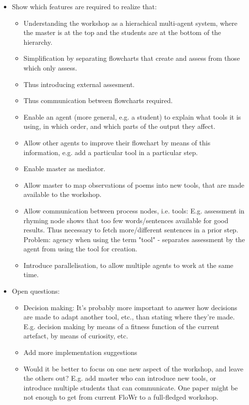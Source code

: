 \begin{itemize}
\begin{itemize}
	\end{itemize}
\item Show which features are required to realize that:
	\begin{itemize}
	\item Understanding the workshop as a hierachical multi-agent system, where the master is at the top and the students are at the bottom of the hierarchy. 
	\item Simplification by separating flowcharts that create and assess from those which only assess. 
	\item Thus introducing external assesment.
	\item Thus communication between flowcharts required.
	\item Enable an agent (more general, e.g. a student) to explain what tools it is using, in which order, and which parts of the output they affect.
	\item Allow other agents to improve their flowchart by means of this information, e.g. add a particular tool in a particular step.
	\item Enable master as mediator.
	\item Allow master to map observations of poems into new tools, that are made available to the workshop.
	\item Allow communication between process nodes, i.e. tools: E.g. assessment in rhyming node shows that too few words/sentences available for good results. Thus necessary to fetch more/different sentences in a prior step. Problem: agency when using the term "tool" - separates assessment by the agent from using the tool for creation.
	\item Introduce parallelisation, to allow multiple agents to work at the same time.
	\end{itemize}
\item Open questions:
\begin{itemize}
	\item Decision making: It's probably more important to answer how decisions are made to adapt another tool, etc., than stating where they're made. E.g. decision making by means of a fitness function of the current artefact, by means of curiosity, etc.
	\item Add more implementation suggestions
	\item Would it be better to focus on one new aspect of the workshop, and leave the others out? E.g. add master who can introduce new tools, or introduce multiple students that can communicate. One paper might be not enough to get from current FloWr to a full-fledged workshop.
\end{itemize}
\end{itemize}


